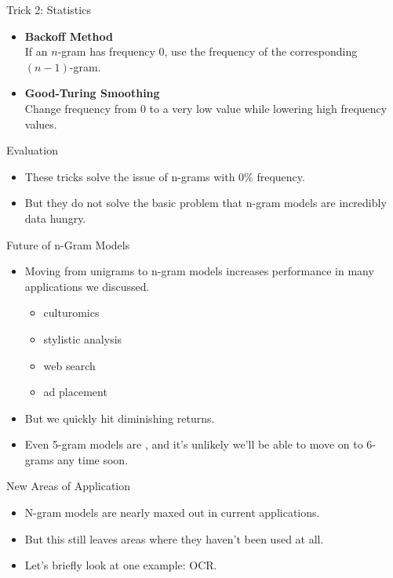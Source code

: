 \documentclass[professionalfonts, xcolor={usenames,svgnames,x11names,table}]{beamer}
\begin{document}
\begin{frame}{Trick 2: Statistics}
    \begin{itemize}
        \item \textbf{Backoff Method}\\
            If an $n$-gram has frequency $0$, use the frequency of the corresponding $(n-1)$-gram.
        \item \textbf{Good-Turing Smoothing}\\
            Change frequency from $0$ to a very low value while lowering high frequency values.
    \end{itemize}

    \begin{block}{Evaluation}
        \begin{itemize}
            \item These tricks solve the issue of n-grams with 0\% frequency.
            \item But they do not solve the basic problem that n-gram models are incredibly data hungry.
        \end{itemize}
    \end{block}
\end{frame}

\begin{frame}{Future of n-Gram Models}
    \begin{itemize}
        \item Moving from unigrams to n-gram models increases performance in many applications we discussed.
            \begin{itemize}
                \item culturomics
                \item stylistic analysis
                \item web search
                \item ad placement
            \end{itemize}
        \item But we quickly hit diminishing returns.
        \item Even 5-gram models are , and it's unlikely we'll be able to move on to 6-grams any time soon.
    \end{itemize}
\end{frame}

\begin{frame}{New Areas of Application}
    \begin{itemize}
        \item N-gram models are nearly maxed out in current applications.
        \item But this still leaves areas where they haven't been used at all.
        \item Let's briefly look at one example: OCR.
    \end{itemize}
\end{frame}
\end{document}
